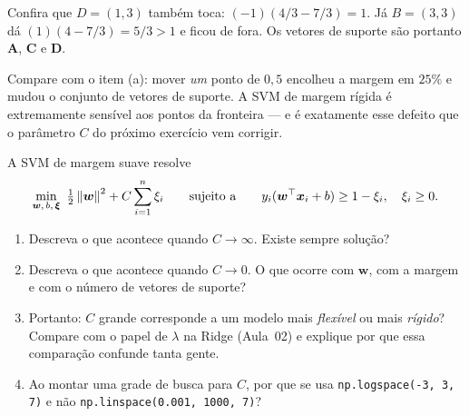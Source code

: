 \documentclass[11pt,a4paper]{article}
\begin{document}
\begin{solucao}
Confira que $D=(1,3)$ também toca: $(-1)(4/3 - 7/3) = 1$. Já $B=(3,3)$ dá
$(1)(4 - 7/3) = 5/3 > 1$ e ficou de fora. Os vetores de suporte são portanto
$\mathbf{A}$, $\mathbf{C}$ e $\mathbf{D}$.

Compare com o item (a): mover \emph{um} ponto de $0{,}5$ encolheu a margem em
$25\%$ e mudou o conjunto de vetores de suporte. A SVM de margem rígida é
extremamente sensível aos pontos da fronteira --- e é exatamente esse defeito que
o parâmetro $C$ do próximo exercício vem corrigir.
\end{solucao}

\begin{exercicio}
A SVM de margem suave resolve
\[
  \min_{\bm w,\,b,\,\bm\xi}\ \tfrac12\left\lVert \bm w \right\rVert^2 + C\sum_{i=1}^n \xi_i
  \qquad\text{sujeito a}\qquad
  y_i(\bm w^\top\bm{x}_i+b)\ge 1-\xi_i,\quad \xi_i\ge 0 .
\]
\begin{enumerate}[label=(\alph*),leftmargin=1.1cm]
  \item Descreva o que acontece quando $C\to\infty$. Existe sempre solução?
  \item Descreva o que acontece quando $C\to 0$. O que ocorre com $\bm w$, com a
        margem e com o número de vetores de suporte?
  \item Portanto: $C$ grande corresponde a um modelo mais \emph{flexível} ou mais
        \emph{rígido}? Compare com o papel de $\lambda$ na Ridge (Aula~02) e
        explique por que essa comparação confunde tanta gente.
  \item Ao montar uma grade de busca para $C$, por que se usa
        \texttt{np.logspace(-3, 3, 7)} e não \texttt{np.linspace(0.001, 1000, 7)}?
\end{enumerate}
\end{exercicio}
\end{document}
